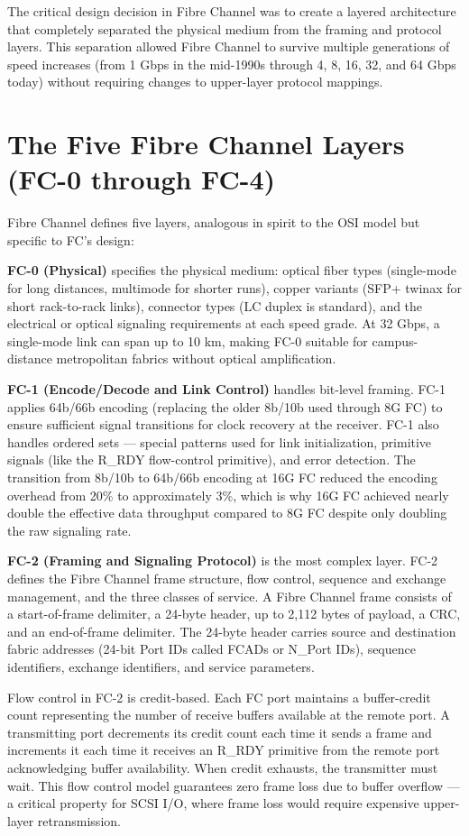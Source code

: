 The critical design decision in Fibre Channel was to create a layered architecture that completely separated the physical medium from the framing and protocol layers. This separation allowed Fibre Channel to survive multiple generations of speed increases (from 1 Gbps in the mid-1990s through 4, 8, 16, 32, and 64 Gbps today) without requiring changes to upper-layer protocol mappings.

\section{The Five Fibre Channel Layers (FC-0 through FC-4)}
Fibre Channel defines five layers, analogous in spirit to the OSI model but specific to FC's design:

\textbf{FC-0 (Physical)} specifies the physical medium: optical fiber types (single-mode for long distances, multimode for shorter runs), copper variants (SFP+ twinax for short rack-to-rack links), connector types (LC duplex is standard), and the electrical or optical signaling requirements at each speed grade. At 32 Gbps, a single-mode link can span up to 10 km, making FC-0 suitable for campus-distance metropolitan fabrics without optical amplification.

\textbf{FC-1 (Encode/Decode and Link Control)} handles bit-level framing. FC-1 applies 64b/66b encoding (replacing the older 8b/10b used through 8G FC) to ensure sufficient signal transitions for clock recovery at the receiver. FC-1 also handles ordered sets --- special patterns used for link initialization, primitive signals (like the R\_RDY flow-control primitive), and error detection. The transition from 8b/10b to 64b/66b encoding at 16G FC reduced the encoding overhead from 20\% to approximately 3\%, which is why 16G FC achieved nearly double the effective data throughput compared to 8G FC despite only doubling the raw signaling rate.

\textbf{FC-2 (Framing and Signaling Protocol)} is the most complex layer. FC-2 defines the Fibre Channel frame structure, flow control, sequence and exchange management, and the three classes of service. A Fibre Channel frame consists of a start-of-frame delimiter, a 24-byte header, up to 2,112 bytes of payload, a CRC, and an end-of-frame delimiter. The 24-byte header carries source and destination fabric addresses (24-bit Port IDs called FCADs or N\_Port IDs), sequence identifiers, exchange identifiers, and service parameters.

Flow control in FC-2 is credit-based. Each FC port maintains a buffer-credit count representing the number of receive buffers available at the remote port. A transmitting port decrements its credit count each time it sends a frame and increments it each time it receives an R\_RDY primitive from the remote port acknowledging buffer availability. When credit exhausts, the transmitter must wait. This flow control model guarantees zero frame loss due to buffer overflow --- a critical property for SCSI I/O, where frame loss would require expensive upper-layer retransmission.

